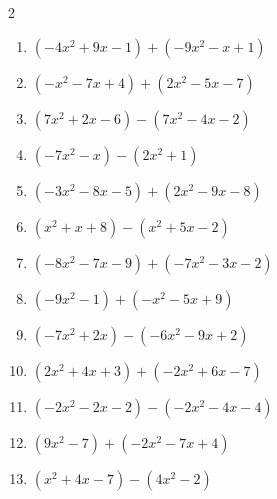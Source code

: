 \begin{multicols}{2}
\begin{enumerate}

  \item $(-4x^{2}+9x-1)+(-9x^{2}-x+1)$


\columnbreak %

\resetques

  \item $(-x^{2}-7x+4)+(2x^{2}-5x-7)$


  \item $(7x^{2}+2x-6)-(7x^{2}-4x-2)$

        \phantom{$=6x-4$}

  \item $(-7x^{2}-x)-(2x^{2}+1)$


  \item $(-3x^{2}-8x-5)+(2x^{2}-9x-8)$


  \item $(x^{2}+x+8)-(x^{2}+5x-2)$

        \phantom{$=-4x+10$}

  \item $(-8x^{2}-7x-9)+(-7x^{2}-3x-2)$


  \item $(-9x^{2}-1)+(-x^{2}-5x+9)$


  \item $(-7x^{2}+2x)-(-6x^{2}-9x+2)$


  \item $(2x^{2}+4x+3)+(-2x^{2}+6x-7)$

        \phantom{$=10x-4$}

  \item $(-2x^{2}-2x-2)-(-2x^{2}-4x-4)$

        \phantom{$=2x+2$}

  \item $(9x^{2}-7)+(-2x^{2}-7x+4)$


  \item $(x^{2}+4x-7)-(4x^{2}-2)$



\end{enumerate}
\end{multicols}
